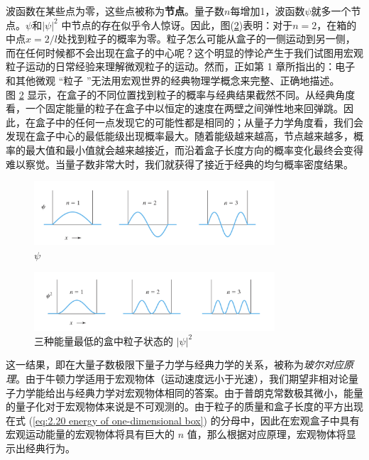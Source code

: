 	\indent 波函数在某些点为零，这些点被称为\textbf{节点}。量子数$n$每增加1，波函数$\psi$就多一个节点。$\psi$和$\left| \psi \right| ^2$ 中节点的存在似乎令人惊讶。因此，图(\ref{fig:2.4})表明：对于$n=2$，在箱的中点$x=2/l$处找到粒子的概率为零。粒子怎么可能从盒子的一侧运动到另一侧，而在任何时候都不会出现在盒子的中心呢？这个明显的悖论产生于我们试图用宏观粒子运动的日常经验来理解微观粒子的运动。然而，正如第 1 章所指出的：电子和其他微观 “粒子 ”无法用宏观世界的经典物理学概念来完整、正确地描述。\\
	\indent 图 \ref{fig:2.4} 显示，在盒子的不同位置找到粒子的概率与经典结果截然不同。从经典角度看，一个固定能量的粒子在盒子中以恒定的速度在两壁之间弹性地来回弹跳。因此，在盒子中的任何一点发现它的可能性都是相同的；从量子力学角度看，我们会发现在盒子中心的最低能级出现概率最大。随着能级越来越高，节点越来越多，概率的最大值和最小值就会越来越接近，而沿着盒子长度方向的概率变化最终会变得难以察觉。当量子数非常大时，我们就获得了接近于经典的均匀概率密度结果。
	\begin{figure}
		\centering
		\includegraphics[width=0.8\textwidth]{Figures/2.3.png}  %
		\caption{ $\psi$ }
		\label{fig:2.3}
	\end{figure}
	\begin{figure}
		\centering
		\includegraphics[width=0.8\textwidth]{Figures/2.4.png}  %
		\caption{{三种能量最低的盒中粒子状态的} $\left| \psi \right| ^2$ }
		\label{fig:2.4}
	\end{figure}
	\indent 这一结果，即在大量子数极限下量子力学与经典力学的关系，被称为\textit{玻尔对应原理}。由于牛顿力学适用于宏观物体（运动速度远小于光速），我们期望非相对论量子力学能给出与经典力学对宏观物体相同的答案。由于普朗克常数极其微小，能量的量子化对于宏观物体来说是不可观测的。由于粒子的质量和盒子长度的平方出现在式 (\ref{eq:2.20 energy of one-dimensional box}) 的分母中，因此在宏观盒子中具有宏观运动能量的宏观物体将具有巨大的 $n$ 值，那么根据对应原理，宏观物体将显示出经典行为。\\
